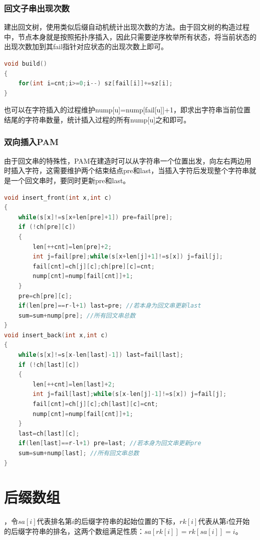 \documentclass[a4paper]{book}
\begin{document}
\subsubsection{回文子串出现次数}
建出回文树，使用类似后缀自动机统计出现次数的方法。由于回文树的构造过程中，节点本身就是按照拓扑序插入，因此只需要逆序枚举所有状态，将当前状态的出现次数加到其fail指针对应状态的出现次数上即可。
\begin{lstlisting}[language=c++]
void build()
{
    for(int i=cnt;i>=0;i--) sz[fail[i]]+=sz[i];
}
\end{lstlisting}
也可以在字符插入的过程维护nump[u]=nump[fail[u]]+1，即求出字符串当前位置结尾的字符串数量，统计插入过程的所有nump[u]之和即可。
\subsubsection{双向插入PAM}
由于回文串的特殊性，PAM在建造时可以从字符串一个位置出发，向左右两边用时插入字符，这需要维护两个结束结点pre和last，当插入字符后发现整个字符串就是一个回文串时，要同时更新pre和last。
\begin{lstlisting}[language=c++]
void insert_front(int x,int c)
{
    while(s[x]!=s[x+len[pre]+1]) pre=fail[pre];
    if (!ch[pre][c]) 
    {
        len[++cnt]=len[pre]+2;
        int j=fail[pre];while(s[x+len[j]+1]!=s[x]) j=fail[j];
        fail[cnt]=ch[j][c];ch[pre][c]=cnt;
        nump[cnt]=nump[fail[cnt]]+1;
    }
    pre=ch[pre][c];
    if(len[pre]==r-l+1) last=pre; //若本身为回文串更新last
    sum=sum+nump[pre]; //所有回文串总数
}
void insert_back(int x,int c)
{
    while(s[x]!=s[x-len[last]-1]) last=fail[last];
    if (!ch[last][c]) 
    {
        len[++cnt]=len[last]+2;
        int j=fail[last];while(s[x-len[j]-1]!=s[x]) j=fail[j];
        fail[cnt]=ch[j][c];ch[last][c]=cnt;
        nump[cnt]=nump[fail[cnt]]+1;
    }
    last=ch[last][c];
    if(len[last]==r-l+1) pre=last; //若本身为回文串更新pre
    sum=sum+nump[last]; //所有回文串总数
}
\end{lstlisting}

\section{后缀数组}
，令$sa[i]$代表排名第$i$的后缀字符串的起始位置的下标，$rk[i]$代表从第$i$位开始的后缀字符串的排名，这两个数组满足性质：$sa[rk[i]]=rk[sa[i]]=i$。\\
\end{document}

